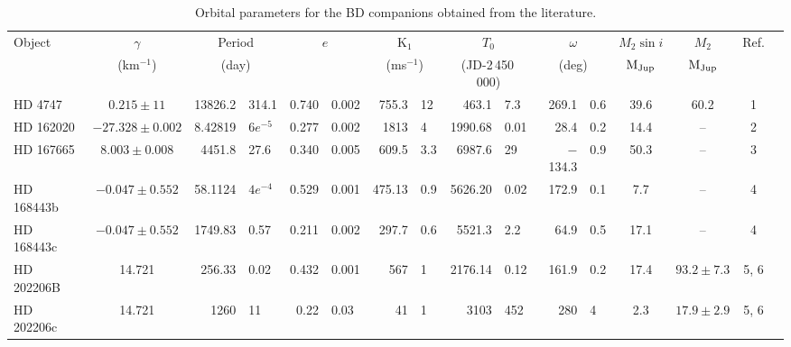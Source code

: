 
\begin{table*}
    \centering
    \footnotesize
    \begin{threeparttable}[b]
        \caption{Orbital parameters for the BD companions obtained from the literature.}
        \begin{tabular}{l c r@{$ \,\pm\, $}l r@{$ \,\pm\, $}l r@{$ \,\pm\, $}l r@{$ \,\pm\, $}l r@{$ \,\pm\, $}l cc c c}
            \toprule
            Object  & \(\gamma \)  	& \multicolumn{2}{c}{Period}   & \multicolumn{2}{c}{\(e \) } &  \multicolumn{2}{c}{\(\textrm{K}_{1} \) } &  \multicolumn{2}{c}{\(T_{0} \)}  &  \multicolumn{2}{c}{ \(\omega \) } & \(M_2\sin{i}\) & \(M_2\) & Ref.\\
            & (km\(^{-1} \)) 	& \multicolumn{2}{c}{(day)}   	&    \multicolumn{2}{c}{}    &  \multicolumn{2}{c}{(ms\(^{-1} \))}   & \multicolumn{2}{c}{ (JD-2\,450\,000) } &  \multicolumn{2}{c}{(deg) } &   \(\rm {M}_{Jup} \)  &   \(\rm {M}_{Jup} \)   & \\
            \midrule
            {HD 4747}       & $0.215 \pm 11 $        	 &  13826.2  &  314.1            &  0.740 & 0.002  	& 755.3   &  12      & 463.1       &  7.3    & 269.1      &  0.6   &  39.6    & 60.2 			  & 1 \\
            {HD 162020}   & $-27.328\pm0.002$  	    &  8.42819  &  $6e^{-5}$   &  0.277 & 0.002   & 1813    &  4        & 1990.68   &  0.01  & 28.4        &  0.2   & 14.4     &     --   			  & 2 \\
            {HD 167665}   & $8.003 \pm 0.008$    	 & 4451.8 & 27.6   				   & 0.340 & 0.005 	  & 609.5   &  3.3     & 6987.6     &  29     & $-$134.3 & 0.9     & 50.3    &     --   			& 3 \\
            {HD 168443}b  & $-0.047\pm0.552$ 		& 58.1124 & $4e^{-4}$  		& 0.529 & 0.001   & 475.13 & 0.9      & 5626.20  &  0.02   & 172.9      & 0.1     & 7.7      &     --    			& 4 \\
            {HD 168443}c  & $-0.047\pm0.552$ 		 & 1749.83 & 0.57  			     & 0.211 & 0.002  	 & 297.7  & 0.6      & 5521.3     &  2.2     & 64.9       & 0.5     & 17.1    &     --    			  & 4 \\
            {HD 202206}B & 14.721     						& 256.33  &  0.02    		     & 0.432 & 0.001  	  & 567     &  1       & 2176.14    &  0.12   & 161.9     & 0.2  	& 17.4    & $93.2\pm7.3$   & 5, 6\\
            {HD 202206}c & 14.721    						 & 1260 &  11			        	& 0.22 & 0.03 		  & 41    	& 1          & 3103 		& 452    & 280 		   & 4  	  & 2.3      & $17.9\pm2.9$  & 5, 6\\

\end{tabular}
\end{threeparttable}
\end{table*}
